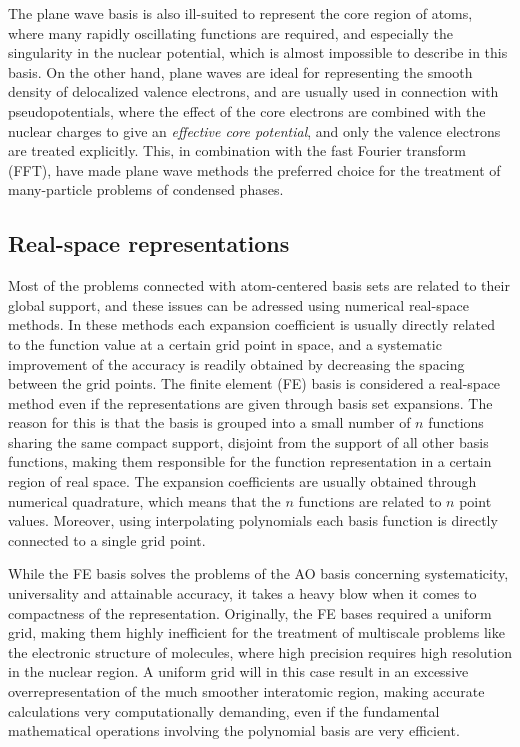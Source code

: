 The plane wave basis is also ill-suited to represent the core region of atoms, where many rapidly 
oscillating functions are required, and especially the singularity in the nuclear potential, which 
is almost impossible to describe in this basis. On the other hand, plane waves are ideal for 
representing the smooth density of delocalized valence electrons, and are usually used in connection 
with pseudopotentials, where the effect of the core electrons are combined with the nuclear charges 
to give an \emph{effective core potential}, and only the valence electrons are treated explicitly. 
This, in combination with the fast Fourier transform (FFT), have made plane wave methods the 
preferred choice for the treatment of many-particle problems of condensed phases. 

\subsection{Real-space representations}
Most of the problems connected with atom-centered basis sets are related to their global support,
and these issues can be adressed using numerical real-space methods. In these methods each expansion
coefficient is usually directly related to the function value at a certain grid point in space, and
a systematic improvement of the accuracy is readily obtained by decreasing the spacing between the 
grid points. The finite element (FE) basis is considered a real-space method even if the representations
are given through basis set expansions. The reason for this is that the basis is grouped into a small
number of $n$ functions sharing the same compact support, disjoint from the support of all other basis 
functions, making them responsible for the function representation in a certain region of real space.
The expansion coefficients are usually obtained through numerical quadrature, which means that the $n$
functions are related to $n$ point values. Moreover, using interpolating polynomials each basis function 
is directly connected to a single grid point.

While the FE basis solves the problems of the AO basis concerning systematicity, universality and 
attainable accuracy, it takes a heavy blow when it comes to compactness of the representation. 
Originally, the FE bases required a uniform grid, making them highly inefficient for the treatment of
multiscale problems like the electronic structure of molecules, where high precision requires 
high resolution in the nuclear region. A uniform grid will in this case result in an excessive 
overrepresentation of the much smoother interatomic region, making accurate calculations very 
computationally demanding, even if the fundamental mathematical operations involving the polynomial
basis are very efficient. 

